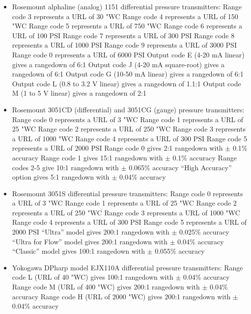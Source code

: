 \begin{itemize}
\item{} Rosemount alphaline (analog) 1151 differential pressure transmitters:
\itemitem{} Range code 3 represents a URL of 30 "WC
\itemitem{} Range code 4 represents a URL of 150 "WC
\itemitem{} Range code 5 represents a URL of 750 "WC
\itemitem{} Range code 6 represents a URL of 100 PSI
\itemitem{} Range code 7 represents a URL of 300 PSI
\itemitem{} Range code 8 represents a URL of 1000 PSI
\itemitem{} Range code 9 represents a URL of 3000 PSI
\itemitem{} Range code 0 represents a URL of 6000 PSI
\itemitem{} Output code E (4-20 mA linear) gives a rangedown of 6:1
\itemitem{} Output code J (4-20 mA square-root) gives a rangedown of 6:1
\itemitem{} Output code G (10-50 mA linear) gives a rangedown of 6:1
\itemitem{} Output code L (0.8 to 3.2 V linear) gives a rangedown of 1.1:1
\itemitem{} Output code M (1 to 5 V linear) gives a rangedown of 2:1
\vskip 5pt
\item{} Rosemount 3051CD (differential) and 3051CG (gauge) pressure transmitters:
\itemitem{} Range code 0 represents a URL of 3 "WC
\itemitem{} Range code 1 represents a URL of 25 "WC
\itemitem{} Range code 2 represents a URL of 250 "WC
\itemitem{} Range code 3 represents a URL of 1000 "WC
\itemitem{} Range code 4 represents a URL of 300 PSI
\itemitem{} Range code 5 represents a URL of 2000 PSI
\itemitem{} Range code 0 gives 2:1 rangedown with $\pm$ 0.1\% accuracy
\itemitem{} Range code 1 gives 15:1 rangedown with $\pm$ 0.1\% accuracy
\itemitem{} Range codes 2-5 give 10:1 rangedown with $\pm$ 0.065\% accuracy
\itemitem{} ``High Accuracy'' option gives 5:1 rangedown with $\pm$ 0.04\% accuracy
\vskip 5pt
\item{} Rosemount 3051S differential pressure transmitters:
\itemitem{} Range code 0 represents a URL of 3 "WC
\itemitem{} Range code 1 represents a URL of 25 "WC
\itemitem{} Range code 2 represents a URL of 250 "WC
\itemitem{} Range code 3 represents a URL of 1000 "WC
\itemitem{} Range code 4 represents a URL of 300 PSI
\itemitem{} Range code 5 represents a URL of 2000 PSI
\itemitem{} ``Ultra'' model gives 200:1 rangedown with $\pm$ 0.025\% accuracy
\itemitem{} ``Ultra for Flow'' model gives 200:1 rangedown with $\pm$ 0.04\% accuracy
\itemitem{} ``Classic'' model gives 100:1 rangedown with $\pm$ 0.055\% accuracy
\vskip 5pt
\item{} Yokogawa DPharp model EJX110A differential pressure transmitters:
\itemitem{} Range code L (URL of 40 "WC) gives 100:1 rangedown with $\pm$ 0.04\% accuracy
\itemitem{} Range code M (URL of 400 "WC) gives 200:1 rangedown with $\pm$ 0.04\% accuracy
\itemitem{} Range code H (URL of 2000 "WC) gives 200:1 rangedown with $\pm$ 0.04\% accuracy
\end{itemize}










